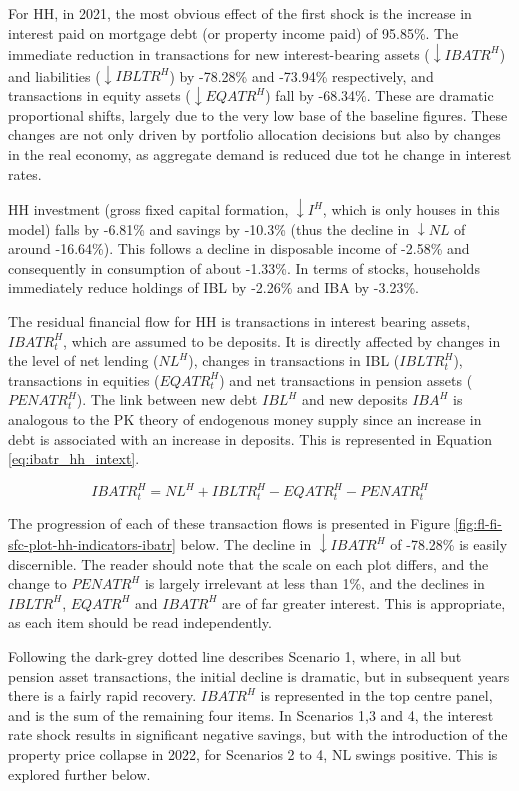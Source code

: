 \documentclass[
]{book}
\begin{document}
For HH, in 2021, the most obvious effect of the first shock is the increase in interest paid on mortgage debt (or property income paid) of 95.85\%. The immediate reduction in transactions for new interest-bearing assets (\(\downarrow IBATR^H\)) and liabilities (\(\downarrow IBLTR^H\)) by -78.28\% and -73.94\% respectively, and transactions in equity assets (\(\downarrow EQATR^H\)) fall by -68.34\%. These are dramatic proportional shifts, largely due to the very low base of the baseline figures. These changes are not only driven by portfolio allocation decisions but also by changes in the real economy, as aggregate demand is reduced due tot he change in interest rates.

HH investment (gross fixed capital formation, \(\downarrow I^H\), which is only houses in this model) falls by -6.81\% and savings by -10.3\% (thus the decline in \(\downarrow NL\) of around -16.64\%). This follows a decline in disposable income of -2.58\% and consequently in consumption of about -1.33\%. In terms of stocks, households immediately reduce holdings of IBL by -2.26\% and IBA by -3.23\%.

The residual financial flow for HH is transactions in interest bearing assets, \(IBATR^H_t\), which are assumed to be deposits. It is directly affected by changes in the level of net lending (\(NL^H\)), changes in transactions in IBL (\(IBLTR^H_t\)), transactions in equities (\(EQATR^H_t\)) and net transactions in pension assets (\(PENATR^H_t\)). The link between new debt \(IBL^H\) and new deposits \(IBA^H\) is analogous to the PK theory of endogenous money supply since an increase in debt is associated with an increase in deposits. This is represented in Equation \ref{eq:ibatr_hh_intext}.

\begin{equation}
IBATR^H_t = NL^H + IBLTR^H_t - EQATR^H_t - PENATR^H_t
\label{eq:ibatr_hh_intext}
\end{equation}

The progression of each of these transaction flows is presented in Figure \ref{fig:fl-fi-sfc-plot-hh-indicators-ibatr} below. The decline in \(\downarrow IBATR^H\) of -78.28\% is easily discernible. The reader should note that the scale on each plot differs, and the change to \(PENATR^H\) is largely irrelevant at less than 1\%, and the declines in \(IBLTR^H\), \(EQATR^H\) and \(IBATR^H\) are of far greater interest. This is appropriate, as each item should be read independently.

Following the dark-grey dotted line describes Scenario 1, where, in all but pension asset transactions, the initial decline is dramatic, but in subsequent years there is a fairly rapid recovery. \(IBATR^H\) is represented in the top centre panel, and is the sum of the remaining four items. In Scenarios 1,3 and 4, the interest rate shock results in significant negative savings, but with the introduction of the property price collapse in 2022, for Scenarios 2 to 4, NL swings positive. This is explored further below.
\end{document}
